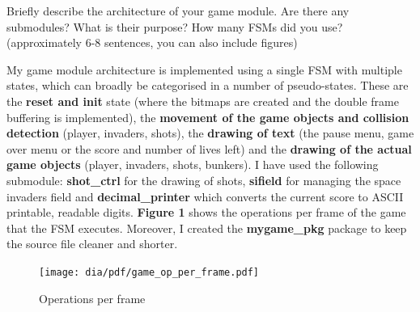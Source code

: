 \documentclass[10pt,a4paper,titlepage,oneside]{article}
\begin{document}
\maketitle



\begin{qa}{Briefly describe the architecture of your \textsf{game} module. Are there any submodules? What is their purpose? How many FSMs did you use? (approximately 6-8 sentences, you can also include figures)}

	My game module architecture is implemented using a single FSM with multiple states, which can broadly be categorised in a number of pseudo-states. These are the \textbf{reset and init} state 
	(where the bitmaps are created and the double frame buffering is implemented), the \textbf{movement of the game objects and collision detection} (player, invaders, shots), the \textbf{drawing of text} 
	(the pause menu, game over menu or the score and number of lives left) and the \textbf{drawing of the actual game objects} (player, invaders, shots, bunkers). I have used the following submodule: 
	\textbf{shot\_ctrl} for the drawing of shots, \textbf{sifield} for managing the space invaders field and \textbf{decimal\_printer} which converts the current score to ASCII printable, readable
	digits. \textbf{Figure 1} shows the operations per frame of the game that the FSM executes. Moreover, I created the \textbf{mygame\_pkg} package to keep the source file cleaner and shorter.

	\begin{figure}[h!]
		\centering
		\texttt{[image: dia/pdf/game\_op\_per\_frame.pdf]}
		\caption{Operations per frame}
	\end{figure}
\end{qa}




\end{document}
